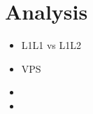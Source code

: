 \chapter{Analysis}
\label{chapter:hps:analysis}

\begin{itemize}
  \item L1L1 vs L1L2
  \item VPS
  \item \maxyzeroerr
  \item \minyzero
\end{itemize}

\begin{figure}
  \centering
  \begin{subfigure}{0.48\textwidth}
    \centering
    \resizebox{\textwidth}{!}{}
  \end{subfigure}
  ~
  \begin{subfigure}{0.48\textwidth}
    \centering
    \resizebox{\textwidth}{!}{}
  \end{subfigure}
  \caption{}
\end{figure}
